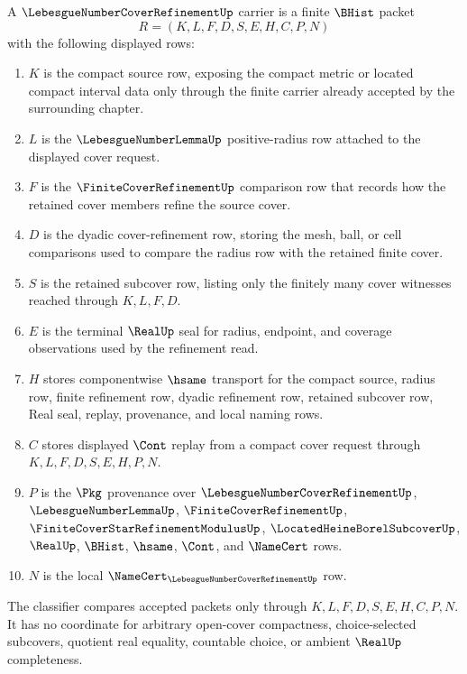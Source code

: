 \begin{definition}
\label{def:lebesgue-number-cover-refinement-carrier}
A $\LebesgueNumberCoverRefinementUp$ carrier is a finite $\BHist$ packet
$$
R=(K,L,F,D,S,E,H,C,P,N)
$$
with the following displayed rows:
\begin{enumerate}
\item $K$ is the compact source row, exposing the compact metric or located compact interval data only through the finite carrier already accepted by the surrounding chapter.
\item $L$ is the $\LebesgueNumberLemmaUp$ positive-radius row attached to the displayed cover request.
\item $F$ is the $\FiniteCoverRefinementUp$ comparison row that records how the retained cover members refine the source cover.
\item $D$ is the dyadic cover-refinement row, storing the mesh, ball, or cell comparisons used to compare the radius row with the retained finite cover.
\item $S$ is the retained subcover row, listing only the finitely many cover witnesses reached through $K,L,F,D$.
\item $E$ is the terminal $\RealUp$ seal for radius, endpoint, and coverage observations used by the refinement read.
\item $H$ stores componentwise $\hsame$ transport for the compact source, radius row, finite refinement row, dyadic refinement row, retained subcover row, Real seal, replay, provenance, and local naming rows.
\item $C$ stores displayed $\Cont$ replay from a compact cover request through $K,L,F,D,S,E,H,P,N$.
\item $P$ is the $\Pkg$ provenance over $\LebesgueNumberCoverRefinementUp$, $\LebesgueNumberLemmaUp$, $\FiniteCoverRefinementUp$, $\FiniteCoverStarRefinementModulusUp$, $\LocatedHeineBorelSubcoverUp$, $\RealUp$, $\BHist$, $\hsame$, $\Cont$, and $\NameCert$ rows.
\item $N$ is the local $\NameCert_{\LebesgueNumberCoverRefinementUp}$ row.
\end{enumerate}
The classifier compares accepted packets only through $K,L,F,D,S,E,H,C,P,N$. It has no coordinate for arbitrary open-cover compactness, choice-selected subcovers, quotient real equality, countable choice, or ambient $\RealUp$ completeness.
\end{definition}

